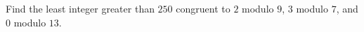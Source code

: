 Find the least integer greater than $250$ congruent to $2$ modulo $9$, $3$ modulo $7$, and $0$ modulo $13$.
